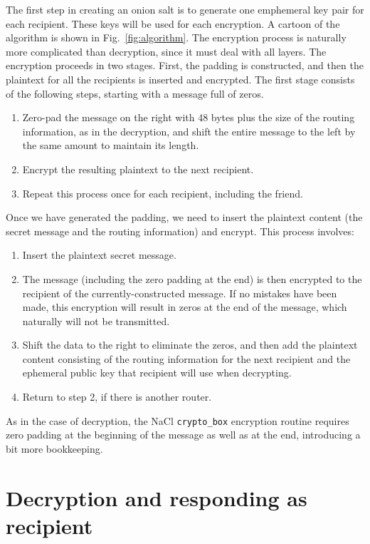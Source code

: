 \documentclass[letterpaper,twocolumn,amsmath,amssymb,pre,aps,10pt]{revtex4-1}
\begin{document}
The first step in creating an onion salt is to generate one emphemeral
key pair for each recipient.  These keys will be used for each
encryption.  A cartoon of the algorithm is shown in
Fig.~\ref{fig:algorithm}.  The encryption process is naturally more
complicated than decryption, since it must deal with all layers.  The
encryption proceeds in two stages.  First, the padding is constructed,
and then the plaintext for all the recipients is inserted and
encrypted.  The first stage consists of the following steps, starting
with a message full of zeros.
\begin{enumerate}
\item Zero-pad the message on the right with 48 bytes plus the size of
  the routing information, as in the decryption, and shift the entire
  message to the left by the same amount to maintain its length.
\item Encrypt the resulting plaintext to the next recipient.
\item Repeat this process once for each recipient, including the
  friend.
\end{enumerate}
Once we have generated the padding, we need to insert the plaintext
content (the secret message and the routing information) and encrypt.
This process involves:
\begin{enumerate}
\item Insert the plaintext secret message.
\item The message (including the zero padding at the end) is then
  encrypted to the recipient of the currently-constructed message.  If
  no mistakes have been made, this encryption will result in zeros at
  the end of the message, which naturally will not be transmitted.
\item Shift the data to the right to eliminate the zeros, and then add
  the plaintext content consisting of the routing information for the
  next recipient and the ephemeral public key that recipient will use
  when decrypting.
\item Return to step 2, if there is another router.
\end{enumerate}
As in the case of decryption, the NaCl \texttt{crypto\_box} encryption
routine requires zero padding at the beginning of the message as well
as at the end, introducing a bit more bookkeeping.

\section{Decryption and responding as recipient}
\end{document}
